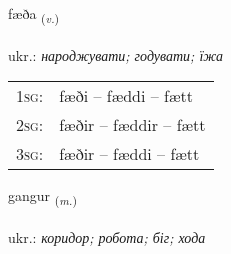 \documentclass[frontgrid, backgrid]{flacards}\usepackage[]{graphicx}\usepackage[]{xcolor}
\begin{document}
\renewcommand{\flhead}{\vskip5pt \fboxsep=0pt {\small\bfseries\footnotesize Sagnorð | дієслово}}
\renewcommand{\fcfoot}{\vskip5pt \fboxsep=0pt \hspace{2pt}{\small\bfseries\footnotesize 1K}}

\renewcommand{\blhead}{\vskip5pt {\small\bfseries\footnotesize Sagnorð | дієслово }}
\renewcommand{\bcfoot}{\vskip5pt \hspace{2pt}{\small\bfseries\footnotesize 1K}}


{fæða \small{\textsubscript{(\textit{v.})}} \\[1ex] %
\textphonetic{[faiːða]} \\
ukr.: \emph{народжувати; годувати; їжа} \\  [2ex]
\renewcommand*{\arraystretch}{0.8}
\begin{tabular}{p{1cm}l}
\textsc{1sg}: & fæði -- fæddi -- fætt \\ 
\textsc{2sg}: & fæðir -- fæddir -- fætt \\ 
\textsc{3sg}: & fæðir -- fæddi -- fætt \\ 
\end{tabular}
}

\renewcommand{\flhead}{\vskip5pt \fboxsep=0pt {\small\bfseries\footnotesize Nafnorð | іменник}}
\renewcommand{\fcfoot}{\vskip5pt \fboxsep=0pt \hspace{2pt}{\small\bfseries\footnotesize 1K}}

\renewcommand{\blhead}{\vskip5pt {\small\bfseries\footnotesize Nafnorð | іменник }}
\renewcommand{\bcfoot}{\vskip5pt \hspace{2pt}{\small\bfseries\footnotesize 1K}}


{gangur \small{\textsubscript{(\textit{m.})}} \\[1ex] %
\textphonetic{[kauŋkʏr]} \\
ukr.: \emph{коридор; робота; біг; хода} \\  [2ex]
\renewcommand*{\arraystretch}{0.8}
}
\end{document}
